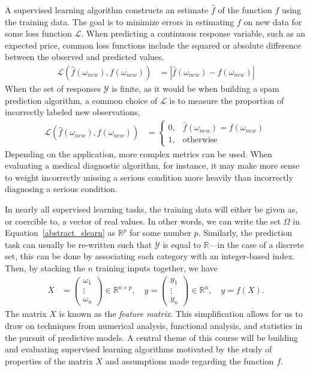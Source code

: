 \documentclass[12pt,hidelinks]{article}
\numberwithin{equation}{section}
\begin{document}
A supervised learning algorithm constructs an estimate $\widehat{f}$ of the
function $f$ using the training data. The goal is to minimize errors in
estimating $f$ on new data for some loss function $\mathcal{L}$.
When predicting a continuous response variable, such as an expected price,
common loss functions include the squared or absolute difference between the
observed and predicted values,
\begin{align}
\mathcal{L} (\widehat{f}(\omega_{new}), f(\omega_{new})) &=
\left| \widehat{f}(\omega_{new}) - f(\omega_{new}) \right|
\end{align}
When the set of responses $\mathcal{Y}$ is
finite, as it would be when building a spam prediction algorithm, a common choice
of $\mathcal{L}$ is to measure the proportion of incorrectly labeled new
observations,
\begin{align}
\mathcal{L} (\widehat{f}(\omega_{new}), f(\omega_{new})) &=
\begin{cases} 0, & \widehat{f}(\omega_{new}) = f(\omega_{new}) \\
1, & \text{otherwise}  \end{cases}
\end{align}
Depending on the application, more complex metrics can be used. When
evaluating a medical diagnostic algorithm, for instance, it may make more
sense to weight incorrectly missing a serious condition more heavily than
incorrectly diagnosing a serious condition.

In nearly all supervised learning tasks, the training data will either be
given as, or coercible to, a vector of real values. In other words, we can
write the set $\Omega$ in Equation~\ref{abstract_slearn} as $\mathbb{R}^p$ for
some number $p$. Similarly, the prediction task can usually be re-written such
that $\mathcal{Y}$ is equal to $\mathbb{R}$---in the case of a discrete set,
this can be done by associating each category with an integer-based index.
Then, by stacking the $n$ training inputs together, we have
\begin{align}
X &= \begin{pmatrix} \omega_1 \\ \vdots \\ \omega_n \end{pmatrix} \in
\mathbb{R}^{n\times p}, \quad y =
\begin{pmatrix} y_1 \\ \vdots \\ y_n \end{pmatrix} \in \mathbb{R}^{n},
\quad y = f(X).
\end{align}
The matrix $X$ is known as the \textit{feature matrix}.
This simplification allows for us to draw on techniques from numerical
analysis, functional analysis, and statistics in the pursuit of predictive
models. A central theme of this course will be building and evaluating
supervised learning algorithms motivated by the study of properties of the
matrix $X$ and assumptions made regarding the function $f$.
\end{document}
